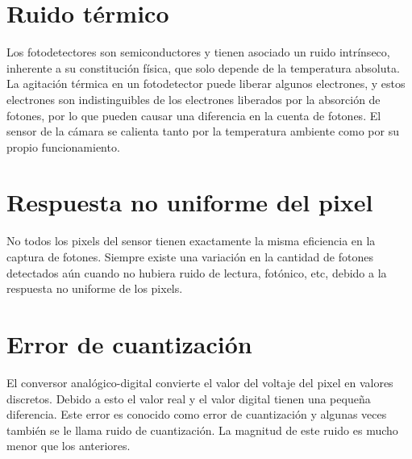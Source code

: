\section{Ruido térmico}
Los fotodetectores son semiconductores y tienen asociado un ruido intrínseco, inherente a su constitución física, que solo depende de la temperatura absoluta.
La agitación térmica en un fotodetector puede liberar algunos electrones, y estos electrones son indistinguibles de los electrones liberados por la absorción de fotones, por lo que pueden causar una diferencia en la cuenta de fotones.
El sensor de la cámara se calienta tanto por la temperatura ambiente como por su propio funcionamiento. 

\section{Respuesta no uniforme del pixel}
No todos los pixels del sensor tienen exactamente la misma eficiencia en la captura de fotones. Siempre existe una variación en la cantidad de fotones detectados aún cuando no hubiera ruido de lectura, fotónico, etc, debido a la respuesta no uniforme de los pixels.

\section{Error de cuantización}
El conversor analógico-digital convierte el valor del voltaje del pixel en valores discretos. Debido a esto el valor real y el valor digital tienen una pequeña diferencia. Este error es conocido como error de cuantización y algunas veces también se le llama ruido de cuantización. La magnitud de este ruido es mucho menor que los anteriores.